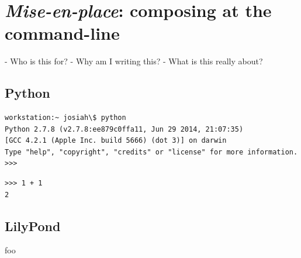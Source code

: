 \section{\emph{Mise-en-place}: composing at the command-line}

\begin{markdown}
-   Who is this for?
-   Why am I writing this?
-   What is this really about?
\end{markdown}

\subsection{Python}

\begin{singlespacing}
\vspace{-0.5\baselineskip}
\begin{lstlisting}
workstation:~ josiah\$ python
Python 2.7.8 (v2.7.8:ee879c0ffa11, Jun 29 2014, 21:07:35)
[GCC 4.2.1 (Apple Inc. build 5666) (dot 3)] on darwin
Type "help", "copyright", "credits" or "license" for more information.
>>>
\end{lstlisting}
\end{singlespacing}

\begin{abjadbookoutput}
\begin{singlespacing}
\vspace{-0.5\baselineskip}
\begin{lstlisting}
>>> 1 + 1
2
\end{lstlisting}
\end{singlespacing}
\end{abjadbookoutput}

\subsection{LilyPond}

foo

